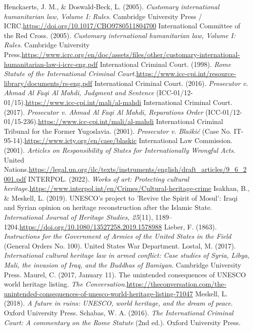 \begin{referencelist}
   Henckaerts, J. M., \& Doswald-Beck, L. (2005). \emph{Customary international humanitarian law, Volume I: Rules}. Cambridge University Press / ICRC.\url{https://doi.org/10.1017/CBO9780511804700}
   International Committee of the Red Cross. (2005). \emph{Customary international humanitarian law, Volume I: Rules}. Cambridge University Press.\url{https://www.icrc.org/en/doc/assets/files/other/customary-international-humanitarian-law-i-icrc-eng.pdf}
   International Criminal Court. (1998). \emph{Rome Statute of the International Criminal Court}.\url{https://www.icc-cpi.int/resource-library/documents/rs-eng.pdf}
   International Criminal Court. (2016). \emph{Prosecutor v. Ahmad Al Faqi Al Mahdi, Judgment and Sentence} (ICC-01/12-01/15).\url{https://www.icc-cpi.int/mali/al-mahdi}
   International Criminal Court. (2017). \emph{Prosecutor v. Ahmad Al Faqi Al Mahdi, Reparations Order} (ICC-01/12-01/15-236).\url{https://www.icc-cpi.int/mali/al-mahdi}
   International Criminal Tribunal for the Former Yugoslavia. (2001). \emph{Prosecutor v. Blaškić} (Case No. IT-95-14).\url{https://www.icty.org/en/case/blaskic}
   International Law Commission. (2001). \emph{Articles on Responsibility of States for Internationally Wrongful Acts}. United Nations.\url{https://legal.un.org/ilc/texts/instruments/english/draft_articles/9_6_2001.pdf}
   INTERPOL. (2022). \emph{Works of art: Protecting cultural heritage}.\url{https://www.interpol.int/en/Crimes/Cultural-heritage-crime}
   Isakhan, B., \& Meskell, L. (2019). UNESCO's project to 'Revive the Spirit of Mosul': Iraqi and Syrian opinion on heritage reconstruction after the Islamic State. \emph{International Journal of Heritage Studies, 25}(11), 1189–1204.\url{https://doi.org/10.1080/13527258.2019.1578988}
   Lieber, F. (1863). \emph{Instructions for the Government of Armies of the United States in the Field} (General Orders No. 100). United States War Department.
   Lostal, M. (2017). \emph{International cultural heritage law in armed conflict: Case studies of Syria, Libya, Mali, the invasion of Iraq, and the Buddhas of Bamiyan}. Cambridge University Press.
   Maurel, C. (2017, January 11). The unintended consequences of UNESCO world heritage listing. \emph{The Conversation}.\url{https://theconversation.com/the-unintended-consequences-of-unesco-world-heritage-listing-71047}
   Meskell, L. (2018). \emph{A future in ruins: UNESCO, world heritage, and the dream of peace}. Oxford University Press.
   Schabas, W. A. (2016). \emph{The International Criminal Court: A commentary on the Rome Statute} (2nd ed.). Oxford University Press.

\end{referencelist}

